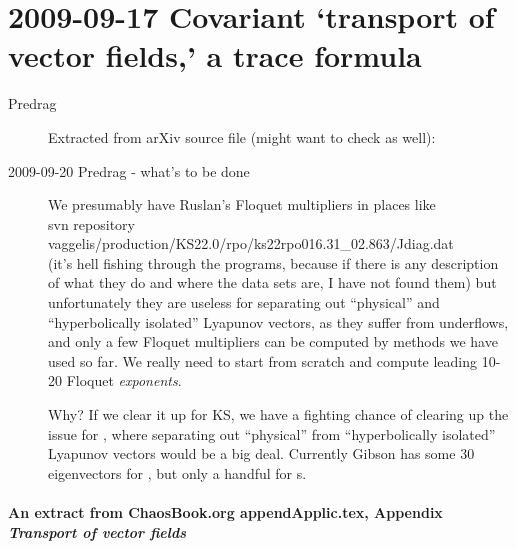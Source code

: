 \section{2009-09-17  Covariant `transport of vector fields,' a trace formula}

\begin{description}
\item[Predrag] Extracted from  arXiv source file
(might want to check  as well):

\item[2009-09-20 Predrag - what's to be done] We presumably have Ruslan's
Floquet multipliers in places like
\\
svn repository vaggelis/production/KS22.0/rpo/ks22rpo016.31\_02.863/Jdiag.dat
\\
(it's hell fishing through the programs, because if there is any description
of what they do and where the data sets are, I have not found them)
but unfortunately they are useless for separating out ``physical'' and
``hyperbolically isolated'' Lyapunov vectors, as they suffer from underflows,
and only a few Floquet multipliers can be computed by methods we have used
so far. We really need to start from scratch and
compute leading 10-20 Floquet {\em exponents}.

Why? If we clear it up for KS,
we have a fighting chance of clearing up the issue for \pCf, where
separating out ``physical'' from
``hyperbolically isolated'' Lyapunov vectors would be a big deal.
Currently Gibson has some 30 eigenvectors for \eqva, but only a handful for
\po s.


\end{description}

\paragraph{
An extract from  ChaosBook.org {appendApplic.tex}, Appendix
{\em Transport of vector fields}
          }
\renewcommand{\ssp}{x}

